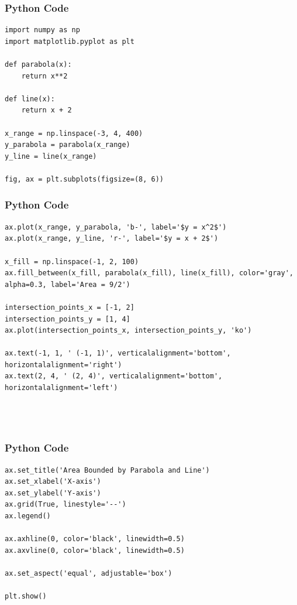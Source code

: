 \documentclass{beamer}
\begin{document}
\begin{frame}[fragile]
    \frametitle{Python Code}
    \begin{lstlisting}
import numpy as np
import matplotlib.pyplot as plt

def parabola(x):
    return x**2

def line(x):
    return x + 2

x_range = np.linspace(-3, 4, 400)
y_parabola = parabola(x_range)
y_line = line(x_range)

fig, ax = plt.subplots(figsize=(8, 6))

    \end{lstlisting}
\end{frame}

\begin{frame}[fragile]
    \frametitle{Python Code}
    \begin{lstlisting}
ax.plot(x_range, y_parabola, 'b-', label='$y = x^2$')
ax.plot(x_range, y_line, 'r-', label='$y = x + 2$')

x_fill = np.linspace(-1, 2, 100)
ax.fill_between(x_fill, parabola(x_fill), line(x_fill), color='gray', alpha=0.3, label='Area = 9/2')
    
intersection_points_x = [-1, 2]
intersection_points_y = [1, 4]
ax.plot(intersection_points_x, intersection_points_y, 'ko')

ax.text(-1, 1, ' (-1, 1)', verticalalignment='bottom', horizontalalignment='right')
ax.text(2, 4, ' (2, 4)', verticalalignment='bottom', horizontalalignment='left')


   
    \end{lstlisting}
\end{frame}

\begin{frame}[fragile]
    \frametitle{Python Code}
    \begin{lstlisting}
ax.set_title('Area Bounded by Parabola and Line')
ax.set_xlabel('X-axis')
ax.set_ylabel('Y-axis')
ax.grid(True, linestyle='--')
ax.legend()

ax.axhline(0, color='black', linewidth=0.5)
ax.axvline(0, color='black', linewidth=0.5)

ax.set_aspect('equal', adjustable='box')

plt.show()

   
    \end{lstlisting}
\end{frame}  
\end{document}
